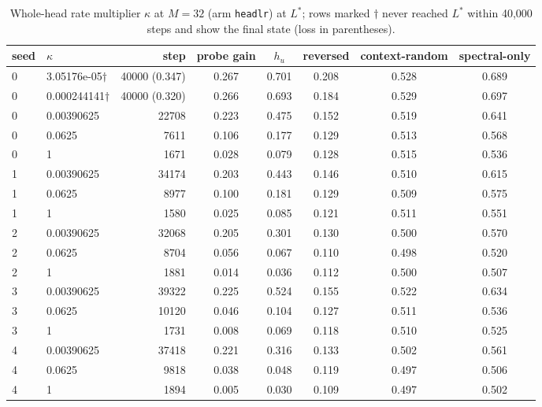 \begin{table}[htbp]\centering\scriptsize
\caption{Whole-head rate multiplier $\kappa$ at $M=32$ (arm \texttt{headlr}) at $L^\ast$; rows marked $\dagger$ never reached $L^\ast$ within 40,000 steps and show the final state (loss in parentheses).}\label{tab:exp2_kappa}
\begin{tabular}{llrccccc}\toprule seed & $\kappa$ & step & probe gain & $h_u$ & reversed & context-random & spectral-only \\ \midrule
0 & 3.05176e-05$\dagger$ & 40000 (0.347) & 0.267 & 0.701 & 0.208 & 0.528 & 0.689 \\
0 & 0.000244141$\dagger$ & 40000 (0.320) & 0.266 & 0.693 & 0.184 & 0.529 & 0.697 \\
0 & 0.00390625 & 22708 & 0.223 & 0.475 & 0.152 & 0.519 & 0.641 \\
0 & 0.0625 & 7611 & 0.106 & 0.177 & 0.129 & 0.513 & 0.568 \\
0 & 1 & 1671 & 0.028 & 0.079 & 0.128 & 0.515 & 0.536 \\
1 & 0.00390625 & 34174 & 0.203 & 0.443 & 0.146 & 0.510 & 0.615 \\
1 & 0.0625 & 8977 & 0.100 & 0.181 & 0.129 & 0.509 & 0.575 \\
1 & 1 & 1580 & 0.025 & 0.085 & 0.121 & 0.511 & 0.551 \\
2 & 0.00390625 & 32068 & 0.205 & 0.301 & 0.130 & 0.500 & 0.570 \\
2 & 0.0625 & 8704 & 0.056 & 0.067 & 0.110 & 0.498 & 0.520 \\
2 & 1 & 1881 & 0.014 & 0.036 & 0.112 & 0.500 & 0.507 \\
3 & 0.00390625 & 39322 & 0.225 & 0.524 & 0.155 & 0.522 & 0.634 \\
3 & 0.0625 & 10120 & 0.046 & 0.104 & 0.127 & 0.511 & 0.536 \\
3 & 1 & 1731 & 0.008 & 0.069 & 0.118 & 0.510 & 0.525 \\
4 & 0.00390625 & 37418 & 0.221 & 0.316 & 0.133 & 0.502 & 0.561 \\
4 & 0.0625 & 9818 & 0.038 & 0.048 & 0.119 & 0.497 & 0.506 \\
4 & 1 & 1894 & 0.005 & 0.030 & 0.109 & 0.497 & 0.502 \\
\bottomrule\end{tabular}\end{table}
